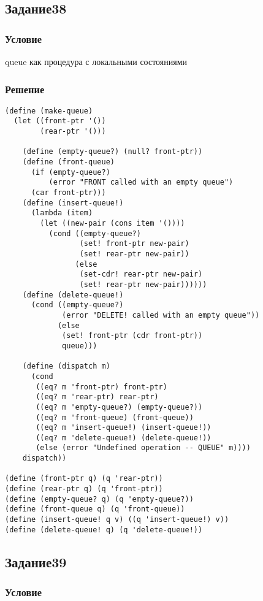 \documentclass[10pt,a4paper]{article}
\begin{document}
\subsection*{Задание38}
\subsubsection*{Условие}
queue как процедура с локальными состояниями
\subsubsection*{Решение}
\begin{lstlisting}
(define (make-queue)
  (let ((front-ptr '())
        (rear-ptr '()))

    (define (empty-queue?) (null? front-ptr))
    (define (front-queue)
      (if (empty-queue?)
          (error "FRONT called with an empty queue")
      (car front-ptr)))
    (define (insert-queue!)
      (lambda (item)
        (let ((new-pair (cons item '())))
          (cond ((empty-queue?)
                 (set! front-ptr new-pair)
                 (set! rear-ptr new-pair))
                (else
                 (set-cdr! rear-ptr new-pair)
                 (set! rear-ptr new-pair))))))
    (define (delete-queue!)
      (cond ((empty-queue?)
             (error "DELETE! called with an empty queue"))
            (else
             (set! front-ptr (cdr front-ptr))
             queue)))

    (define (dispatch m)
      (cond
       ((eq? m 'front-ptr) front-ptr)
       ((eq? m 'rear-ptr) rear-ptr)
       ((eq? m 'empty-queue?) (empty-queue?))
       ((eq? m 'front-queue) (front-queue))
       ((eq? m 'insert-queue!) (insert-queue!))
       ((eq? m 'delete-queue!) (delete-queue!))
       (else (error "Undefined operation -- QUEUE" m))))
    dispatch))

(define (front-ptr q) (q 'rear-ptr))
(define (rear-ptr q) (q 'front-ptr))
(define (empty-queue? q) (q 'empty-queue?))
(define (front-queue q) (q 'front-queue))
(define (insert-queue! q v) ((q 'insert-queue!) v))
(define (delete-queue! q) (q 'delete-queue!))
\end{lstlisting}

\subsection*{Задание39}
\subsubsection*{Условие}
\end{document}
